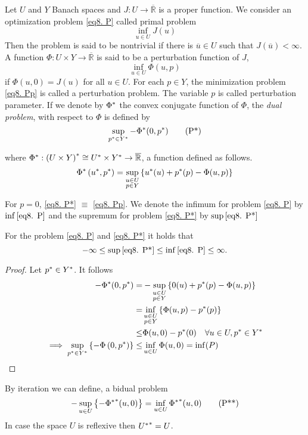 \begin{definition}
Let $U$ and $Y$ Banach spaces and $J: U\rightarrow \overline{\mathbb{R}}$ is a proper function. We consider an optimization problem \eqref{eq8. P} called primal problem
 \[
 \inf_{u\in U} J(u) \tag{P} \label{eq8. P}
 \] 
 Then the problem is said to be nontrivial if there is $\overline{u} \in U$ such that $J(\overline{u}) < \infty$. A function $\Phi : U \times Y \rightarrow \overline{\mathbb{R}}$ is said to be a perturbation function of $J$, 
 \[
 \inf_{u\in U} \Phi (u,p) \tag{Pp}\label{eq8. Pp}
 \]
 if $\Phi(u, 0)=J(u)$ for all $u \in U$. For each $p \in Y$, the minimization problem \eqref{eq8. Pp} is called a perturbation problem. The variable $p$ is called perturbation parameter. If we denote by ${\Phi}^{\ast}$ the convex conjugate function of $\Phi$, the \textit{dual problem}, with respect to $\Phi$ is defined by
 \[
 \sup_{{p}^{\ast}\in {Y}^{\ast}}-{\Phi}^{\ast}(0,{p}^{\ast}) \label{eq8. P*}\tag{P*}
 \]
 
 where ${\Phi}^{\ast}: {(U\times Y)}^{\ast} \cong {U}^{\ast}\times{Y}^{\ast}\rightarrow \overline{\mathbb{R}}$, a function defined as follows.
 \[
 {\Phi}^{\ast}\left({u}^{\ast}, {p}^{\ast} \right) = \sup_{\substack{u \in U\\ p\in Y}} \left\lbrace {u}^{\ast}(u)+{p}^{\ast}(p)-\Phi(u,p)\right\rbrace
 \] 

\end{definition}
 \begin{remark}
For $p=0$, \eqref{eq8. P*} $\equiv$ \eqref{eq8. Pp}. We denote the infimum for problem \eqref{eq8. P} by $\inf\eqref{eq8. P}$ and the supremum for problem \eqref{eq8. P*} by $\sup \eqref{eq8. P*}$
 \end{remark}

 
 \begin{lemma}
 	For the problem \eqref{eq8. P} and \eqref{eq8. P*} it holds that
 	\[
 	 -\infty \leq \sup\eqref{eq8. P*} \leq \inf\eqref{eq8. P} \leq \infty.
 	\]
 	\begin{proof}
 		Let ${p}^{\ast}\in{Y}^{\ast}$. It follows
 		\begin{align*}
 			-{\Phi}^{\ast}(0,{p}^{\ast})=&-\sup_{\substack{u\in U\\ p\in Y}}\left\lbrace 0(u) + {p}^{\ast}(p)-\Phi(u,p)
 			\right\rbrace\\
 			=&\inf_{\substack{u\in U\\p\in Y}} \left\lbrace\Phi(u,p)-{p}^{\ast}(p)\right\rbrace\\
 			\leq & \Phi(u,0)-{p}^{\ast}(0)\quad \forall u \in U, {p}^{\ast} \in {Y}^{\ast}\\
 			\implies \sup_{ {p}^{\ast}\in {Y}^{\ast}}\left\lbrace-\Phi\left(0, {p}^{\ast}\right) \right\rbrace \leq&\inf_{u\in U} \Phi (u, 0) = \inf(P)
 		\end{align*}
 	 \end{proof}
 	\end{lemma}
 	By iteration we can define, a bidual problem 
 	\[
 	-\sup_{u \in U} \left\lbrace-{\Phi^*}^{\ast}(u,0)\right\rbrace=\inf_{u\in U} {\Phi^*}^{\ast}(u,0) \tag{P**} \label{eq8. BiDual Problem}
 	\]
 	In case the space $U$ is reflexive then ${{U}^{\ast}}^{\ast}=U$.
 	
